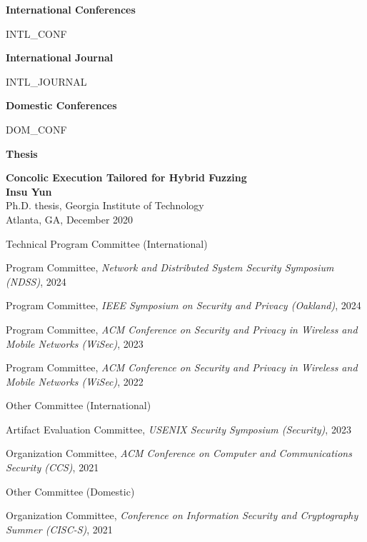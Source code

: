 \documentclass[11pt,letterpaper]{article}
\begin{document}
%
%


\textbf{International Conferences }
\begin{etaremune}
  {{ INTL_CONF }}
\end{etaremune}

\textbf{International Journal}
\begin{etaremune}
  {{ INTL_JOURNAL }}
\end{etaremune}

\textbf{Domestic Conferences}
\begin{etaremune}
  {{ DOM_CONF }}
\end{etaremune}

\textbf{Thesis}
\begin{etaremune}
\item \textbf{Concolic Execution Tailored for Hybrid Fuzzing}  \\
{\footnotesize
  \textbf{Insu Yun} \\
  Ph.D. thesis, Georgia Institute of Technology \\
Atlanta, GA, December 2020
}
\end{etaremune}


\begin{topic}{Technical Program Committee (International)}{}
  \item{Program Committee, \emph{Network and Distributed System Security Symposium (NDSS)}, 2024}
  \item{Program Committee, \emph{IEEE Symposium on Security and Privacy (Oakland)}, 2024}
  \item{Program Committee, \emph{ACM Conference on Security and Privacy in Wireless and Mobile Networks (WiSec)}, 2023}
  \item{Program Committee, \emph{ACM Conference on Security and Privacy in Wireless and Mobile Networks (WiSec)}, 2022}
\end{topic}

\begin{topic}{Other Committee (International)}{}
  \item{Artifact Evaluation Committee, \emph{USENIX Security Symposium (Security)}, 2023}
  \item{Organization Committee, \emph{ACM Conference on Computer and Communications Security (CCS)}, 2021}
\end{topic}

\begin{topic}{Other Committee (Domestic)}{}
  \item{Organization Committee, \emph{Conference on Information Security and Cryptography Summer (CISC-S)}, 2021}
\end{topic}
\end{document}
